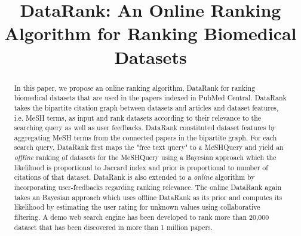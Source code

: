 \documentclass[twoside,11pt]{article}
\begin{document}
\title{DataRank: An Online Ranking Algorithm for Ranking Biomedical Datasets}


\editor{}

\maketitle
\begin{abstract} 
In this paper, we propose an online ranking algorithm, DataRank for ranking biomedical datasets that are used in the papers indexed in PubMed Central. DataRank takes the bipartite citation graph between datasets and articles and dataset features, i.e. MeSH terms, as input and rank datasets according to their relevance to the searching query as well as user feedbacks. DataRank constituted dataset features by aggregating MeSH terms from the connected papers in the bipartite graph. For each search query, DataRank first maps the "free text query" to a MeSHQuery and yield an \emph{offline} ranking of datasets for the MeSHQuery using a Bayesian approach which the likelihood is proportional to Jaccard index and prior is proportional to number of citations of that dataset. DataRank is also extended to a \emph{online} algorithm by incorporating user-feedbacks regarding ranking relevance. The online DataRank again takes an Bayesian approach  which uses offline DataRank as its prior and computes its likelihood by estimating the user rating for unknown values using collaborative filtering. A demo web search engine has been developed to rank more than 20,000 dataset that has been discovered in more than 1 million papers.
\end{abstract} 
\end{document}
